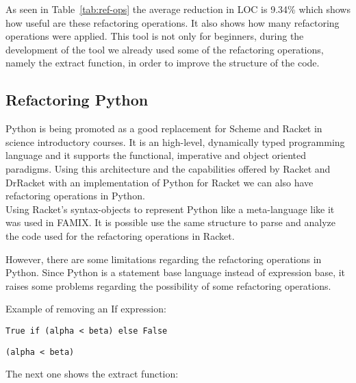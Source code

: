 As seen in Table~\ref{tab:ref-ops} the average reduction in LOC is 9.34\% which
shows how useful are these refactoring operations. It also shows how many
refactoring operations were applied.
This tool is not only for beginners, during the development of the tool we already
used some of the refactoring operations, namely the extract function, in order to
improve the structure of the code.


\subsection{Refactoring Python}
Python is being promoted as a good replacement for Scheme and Racket in science introductory courses.
It is an high-level, dynamically typed programming language and it supports the functional, imperative and object
oriented paradigms.
Using this architecture and the capabilities offered by Racket and DrRacket with an implementation of Python for Racket\cite{ramos2014implementation} \cite{ramos2014reaching}
we can also have refactoring operations in Python. \\
Using Racket's syntax-objects to represent Python like a meta-language like it was used in FAMIX\cite{tichelaar2000meta}.
It is possible use the same structure to parse and analyze the code used for the refactoring operations in Racket.

However, there are some limitations regarding the refactoring operations in Python.
Since Python is a statement base language instead of expression base, it raises
some problems regarding the possibility of some refactoring operations.

Example of removing an If expression:
\lstset{style=python}
\begin{lstlisting}
True if (alpha < beta) else False
\end{lstlisting}

\begin{lstlisting}
(alpha < beta)
\end{lstlisting}

The next one shows the extract function:

